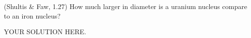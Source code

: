 \documentclass[12pts,answers,addpoints]{exam}
\begin{document}
\begin{questions}
\question[10] (Shultis \& Faw, 1.27) How much larger in diameter is a uranium 
nucleus compare to an iron nucleus?
        \begin{solution}
                        YOUR SOLUTION HERE.
        \end{solution}
\end{questions}



%
%
\end{document}
